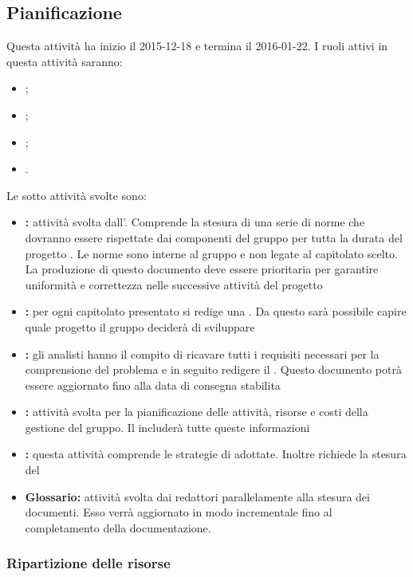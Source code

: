 \documentclass[12pt,a4paper]{article}
\begin{document}
\subsection{Pianificazione} %
Questa attività ha inizio il 2015-12-18 e termina il 2016-01-22. I ruoli attivi in questa attività saranno:
\begin{itemize}
	\item \PM;
	\item \AM;
	\item \AN;
	\item \VR.
\end{itemize}
Le sotto attività svolte sono:
\begin{itemize}
	\item \textbf{\NdP:} attività svolta dall’\AM. Comprende la stesura di una serie di norme che dovranno essere rispettate dai componenti del gruppo per tutta la durata del progetto \prjL. Le norme sono interne al gruppo e non legate al capitolato scelto. La produzione di questo documento deve essere prioritaria per garantire uniformità e correttezza nelle successive attività del progetto
	\item \textbf{\SdF:} per ogni capitolato presentato si redige una \SdF. Da questo sarà possibile capire quale progetto il gruppo deciderà di sviluppare
	\item \textbf{\AdR:} gli analisti hanno il compito di ricavare tutti i requisiti necessari per la comprensione del problema e in seguito redigere il \AdR. Questo documento potrà essere aggiornato fino alla data di consegna stabilita
	\item \textbf{\PdP:} attività svolta per la pianificazione delle attività, risorse e costi della gestione del gruppo. Il \PdP{} includerà tutte queste informazioni
	\item \textbf{\PdQ:} questa attività comprende le strategie di \FVV adottate. Inoltre richiede la stesura del \PdQ
	\item \textbf{Glossario:} attività svolta dai redattori parallelamente alla stesura dei documenti. Esso verrà aggiornato in modo incrementale fino al completamento della documentazione.
\end{itemize}

\subsubsection{Ripartizione delle risorse}
\end{document}
